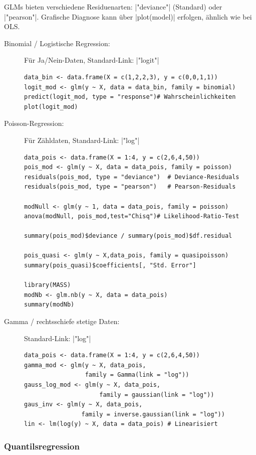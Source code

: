 \documentclass[10pt,twocolumn]{scrartcl}
\renewcommand{\lstinline}{\mycoloredinline}
\begin{document}
GLMs bieten verschiedene Residuenarten: \lstinline|"deviance"| (Standard) oder \lstinline|"pearson"|.  
Grafische Diagnose kann über \lstinline|plot(model)| erfolgen, ähnlich wie bei OLS.

\begin{description}
\item[Binomial / Logistische Regression:] Für Ja/Nein-Daten, Standard-Link: \lstinline|"logit"|
  \begin{lstlisting}
data_bin <- data.frame(X = c(1,2,2,3), y = c(0,0,1,1))
logit_mod <- glm(y ~ X, data = data_bin, family = binomial)
predict(logit_mod, type = "response")# Wahrscheinlichkeiten
plot(logit_mod)
  \end{lstlisting}

\item[Poisson-Regression:] Für Zähldaten, Standard-Link: \lstinline|"log"|
  \begin{lstlisting}
data_pois <- data.frame(X = 1:4, y = c(2,6,4,50))
pois_mod <- glm(y ~ X, data = data_pois, family = poisson)
residuals(pois_mod, type = "deviance")  # Deviance-Residuals
residuals(pois_mod, type = "pearson")   # Pearson-Residuals

modNull <- glm(y ~ 1, data = data_pois, family = poisson)
anova(modNull, pois_mod,test="Chisq")# Likelihood-Ratio-Test

summary(pois_mod)$deviance / summary(pois_mod)$df.residual

pois_quasi <- glm(y ~ X,data_pois, family = quasipoisson)
summary(pois_quasi)$coefficients[, "Std. Error"]

library(MASS)
modNb <- glm.nb(y ~ X, data = data_pois)
summary(modNb)
  \end{lstlisting}

\item[Gamma / rechtsschiefe stetige Daten:] Standard-Link: \lstinline|"log"|
  \begin{lstlisting}
data_pois <- data.frame(X = 1:4, y = c(2,6,4,50))
gamma_mod <- glm(y ~ X, data_pois,
                 family = Gamma(link = "log"))
gauss_log_mod <- glm(y ~ X, data_pois,
                     family = gaussian(link = "log"))
gaus_inv <- glm(y ~ X, data_pois,
                family = inverse.gaussian(link = "log"))
lin <- lm(log(y) ~ X, data = data_pois) # Linearisiert
  \end{lstlisting}
\end{description}


\subsubsection{Quantilsregression}
\end{document}
